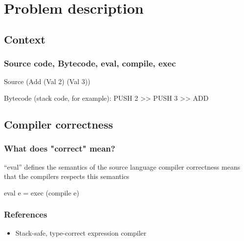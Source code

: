 \section{Problem description}

    \subsection{Context}

\begin{frame}[fragile]
            \frametitle{Source code, Bytecode, eval, compile, exec}

            Source
                (Add (Val 2) (Val 3))

            Bytecode (stack code, for example):
                PUSH 2 >> PUSH 3 >> ADD
\end{frame}

    \subsection{Compiler correctness}
        \begin{frame}
            \frametitle{What does "correct" mean?}

            ``eval'' defines the semantics of the source language
            compiler correctness means that the compilers respects this semantics

            \begin{itemize}
                eval e = exec (compile e)
            \end{itemize}
        \end{frame}


        \begin{frame}
            \frametitle{References}
            \begin{itemize}
                \item Stack-safe, type-correct expression compiler
            \end{itemize}
        \end{frame}
    

